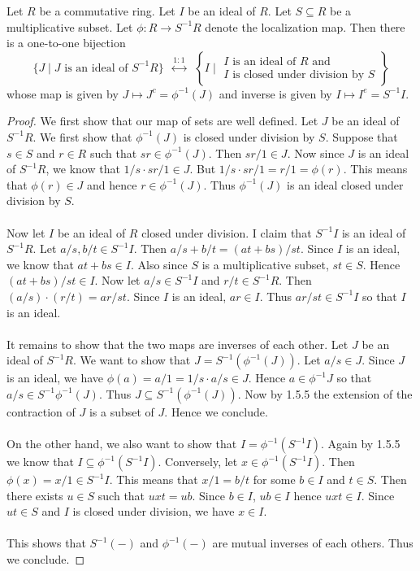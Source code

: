 \documentclass[a4paper]{article}
\begin{document}
\begin{thm}{}{} Let $R$ be a commutative ring. Let $I$ be an ideal of $R$. Let $S\subseteq R$ be a multiplicative subset. Let $\phi:R\to S^{-1}R$ denote the localization map. Then there is a one-to-one bijection $$\{J\;|\;J\text{ is an ideal of }S^{-1}R\}\;\;\overset{1:1}{\longleftrightarrow}\;\;\left\{I\;|\;\substack{I\text{ is an ideal of }R\text{ and }\\I\text{ is closed under division by }S}\right\}$$ whose map is given by $J\mapsto J^c=\phi^{-1}(J)$ and inverse is given by $I\mapsto I^e=S^{-1}I$. 
\begin{proof}
We first show that our map of sets are well defined. Let $J$ be an ideal of $S^{-1}R$. We first show that $\phi^{-1}(J)$ is closed under division by $S$. Suppose that $s\in S$ and $r\in R$ such that $sr\in\phi^{-1}(J)$. Then $sr/1\in J$. Now since $J$ is an ideal of $S^{-1}R$, we know that $1/s\cdot sr/1\in J$. But $1/s\cdot sr/1=r/1=\phi(r)$. This means that $\phi(r)\in J$ and hence $r\in\phi^{-1}(J)$. Thus $\phi^{-1}(J)$ is an ideal closed under division by $S$. \\~\\

Now let $I$ be an ideal of $R$ closed under division. I claim that $S^{-1}I$ is an ideal of $S^{-1}R$. Let $a/s,b/t\in S^{-1}I$. Then $a/s+b/t=(at+bs)/st$. Since $I$ is an ideal, we know that $at+bs\in I$. Also since $S$ is a multiplicative subset, $st\in S$. Hence $(at+bs)/st\in I$. Now let $a/s\in S^{-1}I$ and $r/t\in S^{-1}R$. Then $(a/s)\cdot(r/t)=ar/st$. Since $I$ is an ideal, $ar\in I$. Thus $ar/st\in S^{-1}I$ so that $I$ is an ideal. \\~\\

It remains to show that the two maps are inverses of each other. Let $J$ be an ideal of $S^{-1}R$. We want to show that $J=S^{-1}(\phi^{-1}(J))$. Let $a/s\in J$. Since $J$ is an ideal, we have $\phi(a)=a/1=1/s\cdot a/s\in J$. Hence $a\in\phi^{-1}J$ so that $a/s\in S^{-1}\phi^{-1}(J)$. Thus $J\subseteq S^{-1}(\phi^{-1}(J))$. Now by 1.5.5 the extension of the contraction of $J$ is a subset of $J$. Hence we conclude. \\~\\

On the other hand, we also want to show that $I=\phi^{-1}(S^{-1}I)$. Again by 1.5.5 we know that $I\subseteq\phi^{-1}(S^{-1}I)$. Conversely, let $x\in\phi^{-1}(S^{-1}I)$. Then $\phi(x)=x/1\in S^{-1}I$. This means that $x/1=b/t$ for some $b\in I$ and $t\in S$. Then there exists $u\in S$ such that $uxt=ub$. Since $b\in I$, $ub\in I$ hence $uxt\in I$. Since $ut\in S$ and $I$ is closed under division, we have $x\in I$. \\~\\

This shows that $S^{-1}(-)$ and $\phi^{-1}(-)$ are mutual inverses of each others. Thus we conclude. 
\end{proof}
\end{thm}
\end{document}
